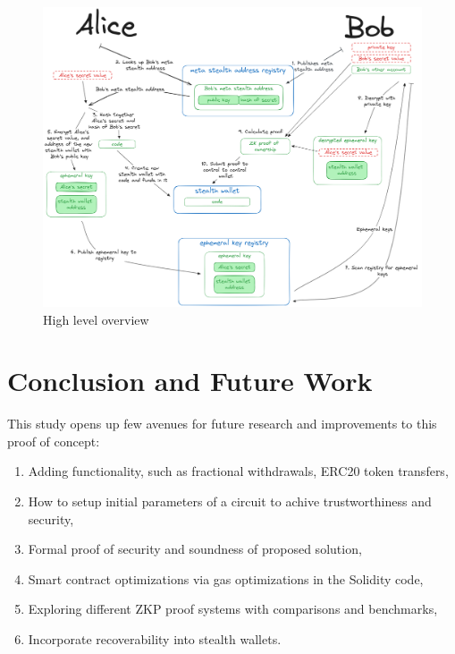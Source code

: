 \documentclass[conference,comsoc,10pt]{IEEEtran}
\begin{document}
    \begin{figure}[h]
        \centering
        \includegraphics[scale=0.11]{../bachelor/assets/images/high-level-flow.png}
        \caption{High level overview}
        \label{fig:high-level-flow}
    \end{figure}

\section{Conclusion and Future Work}

    This study opens up few avenues for future research and improvements
    to this proof of concept:

    \begin{enumerate}
        \item Adding functionality, such as fractional withdrawals, ERC20 token transfers,
        \item How to setup initial parameters of a circuit to achive trustworthiness
                and security,
        \item Formal proof of security and soundness of proposed solution,
        \item Smart contract optimizations via gas optimizations in the Solidity code,
        \item Exploring different ZKP proof systems with comparisons and benchmarks,
        \item Incorporate recoverability into stealth wallets.
    \end{enumerate}
\end{document}
